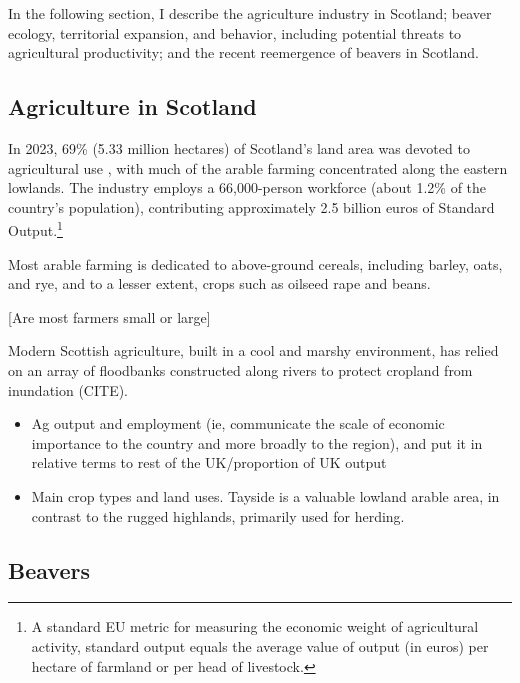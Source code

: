
In the following section, I describe the agriculture industry in Scotland; beaver ecology, territorial expansion, and behavior, including potential threats to agricultural productivity; and the recent reemergence of beavers in Scotland. 

\subsection{Agriculture in Scotland}

In 2023, 69\% (5.33 million hectares) of Scotland's land area was devoted to agricultural use \citep{cabinet_secretary_for_rural_affairs_land_reform_and_islands_results_2023}, with much of the arable farming concentrated along the eastern lowlands. The industry employs a 66,000-person workforce (about 1.2\% of the country's population), contributing approximately 2.5 billion euros of Standard Output.\footnote{A standard EU metric for measuring the economic weight of agricultural activity, standard output equals the average value of output (in euros) per hectare of farmland or per head of livestock.}

Most arable farming is dedicated to above-ground cereals, including barley, oats, and rye, and to a lesser extent, crops such as oilseed rape and beans.

[Are most farmers small or large]

Modern Scottish agriculture, built in a cool and marshy environment, has relied on an array of floodbanks constructed along rivers to protect cropland from inundation (CITE).

\begin{itemize}
    \item Ag output and employment (ie, communicate the scale of economic importance to the country and more broadly to the region), and put it in relative terms to rest of the UK/proportion of UK output
    \item Main crop types and land uses. Tayside is a valuable lowland arable area, in contrast to the rugged highlands, primarily used for herding.
\end{itemize}

\subsection{Beavers}

